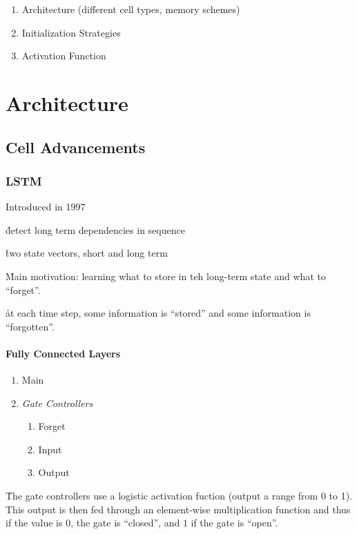 \begin{enumerate}[noitemsep,topsep=0pt]
	\item Architecture (different cell types, memory schemes)
	\item Initialization Strategies
	\item Activation Function
\end{enumerate}




\section{Architecture}


\subsection{Cell Advancements}

\subsubsection{LSTM}

Introduced in 1997 %

\r{detect long term dependencies in sequence}

\r{two state vectors, short and long term}

\r{Main motivation: learning what to store in teh long-term state and what to ``forget''.}

\r{at each time step, some information is ``stored'' and some information is ``forgotten''.}

\paragraph{Fully Connected Layers}


\begin{enumerate}[noitemsep,topsep=0pt]
	\item Main
	\item \textit{Gate Controllers}
	\begin{enumerate}[noitemsep,topsep=0pt]
		\item Forget
		\item Input
		\item Output
	\end{enumerate}
\end{enumerate}

\r{The gate controllers use a logistic activation fuction (output a range from 0 to 1). This output is then fed through an element-wise multiplication function and thus if the value is $0$, the gate is ``closed'', and $1$ if the gate is ``open''.}

